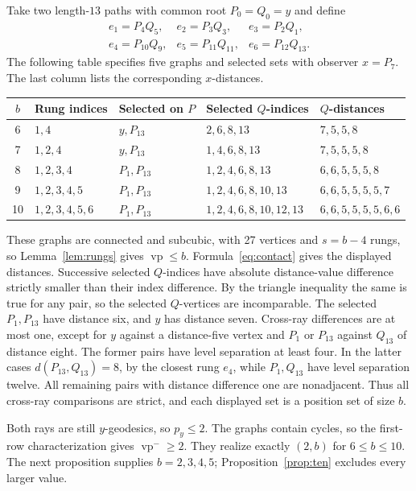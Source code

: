 \documentclass[11pt]{article}
\theoremstyle{remark}\newtheorem{remark}[theorem]{Remark}
\newcommand{\vp}{\operatorname{vp}}
\newcommand{\vpm}{\operatorname{vp}^{-}}
\begin{document}
Take two length-$13$ paths with common root $P_0=Q_0=y$ and define
\[
\begin{array}{lll}
 e_1=P_4Q_5,&e_2=P_3Q_3,&e_3=P_2Q_1,\\
 e_4=P_{10}Q_9,&e_5=P_{11}Q_{11},&e_6=P_{12}Q_{13}.
\end{array}
\]
The following table specifies five graphs and selected sets with observer
$x=P_7$. The last column lists the corresponding $x$-distances.
\begin{center}
\small
\begin{tabular}{@{}c l l l l@{}}
\toprule
$b$ & Rung indices & Selected on $P$ & Selected $Q$-indices & $Q$-distances\\
\midrule
6 & $1,4$ & $y,P_{13}$ & $2,6,8,13$ & $7,5,5,8$\\
7 & $1,2,4$ & $y,P_{13}$ & $1,4,6,8,13$ & $7,5,5,5,8$\\
8 & $1,2,3,4$ & $P_1,P_{13}$ & $1,2,4,6,8,13$ & $6,6,5,5,5,8$\\
9 & $1,2,3,4,5$ & $P_1,P_{13}$ & $1,2,4,6,8,10,13$ & $6,6,5,5,5,5,7$\\
10 & $1,2,3,4,5,6$ & $P_1,P_{13}$ & $1,2,4,6,8,10,12,13$ & $6,6,5,5,5,5,6,6$\\
\bottomrule
\end{tabular}
\end{center}
These graphs are connected and subcubic, with 27 vertices and $s=b-4$
rungs, so Lemma~\ref{lem:rungs} gives $\vp\le b$. Formula~\eqref{eq:contact}
gives the displayed distances. Successive selected $Q$-indices have absolute
distance-value difference strictly smaller than their index difference.
By the triangle inequality the same is true for any pair, so the selected
$Q$-vertices are incomparable. The selected $P_1,P_{13}$ have distance six,
and $y$ has distance seven. Cross-ray differences are at most one, except
for $y$ against a distance-five vertex and $P_1$ or $P_{13}$ against $Q_{13}$
of distance eight. The former pairs have level separation at least four.
In the latter cases $d(P_{13},Q_{13})=8$, by the closest rung $e_4$, while
$P_1,Q_{13}$ have level separation twelve. All remaining pairs with distance
difference one are nonadjacent. Thus all cross-ray comparisons are strict,
and each displayed set is a position set of size $b$.

Both rays are still $y$-geodesics, so $p_y\le2$. The graphs contain cycles,
so the first-row characterization gives $\vpm\ge2$. They realize exactly
$(2,b)$ for $6\le b\le10$. The next proposition supplies $b=2,3,4,5$;
Proposition~\ref{prop:ten} excludes every larger value.
\end{document}
